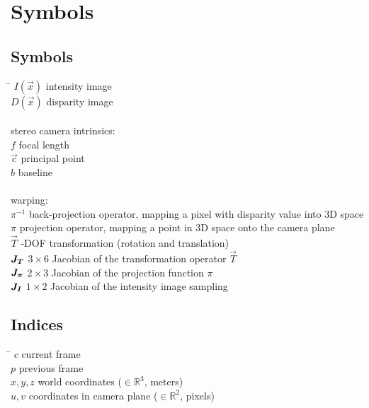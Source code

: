 \chapter*{Symbols}
\label{sec:symbols}

\section*{Symbols}

\begin{tabbing}
 \hspace*{1.6cm} \= \kill
 $I(\vec{x})$          \> intensity image \\[0.5ex]
 $D(\vec{x})$          \> disparity image \\[0.5ex]
 \\
 stereo camera intrinsics: \\
 $f$                            \> focal length \\[0.5ex]
 $\vec{c}$                      \> principal point \\[0.5ex]
 $b$                            \> baseline \\[0.5ex]
 \\
 warping: \\
 $\pi^{-1}$                     \> back-projection operator, mapping a pixel with disparity value into 3D space \\[0.5ex]
 $\pi$                          \> projection operator, mapping a point in 3D space onto the camera plane \\[0.5ex]
 $\vec{T}$                      -DOF transformation (rotation and translation) \\[0.5ex]
 $\mat{J_T}$                    \> $3 \times 6$ Jacobian of the transformation operator $\vec{T}$ \\[0.5ex]
 $\mat{J_{\pi}}$                    \> $2 \times 3$ Jacobian of the projection function $\pi$ \\[0.5ex]
 $\mat{J_I}$                    \> $1 \times 2$ Jacobian of the intensity image sampling \\[0.5ex]
\end{tabbing}

\section*{Indices}
\begin{tabbing}
 \hspace*{1.6cm}  \= \kill
 $c$ \> current frame \\[0.5ex]
 $p$ \> previous frame \\[0.5ex]
 $x, y, z$ \> world coordinates ($\in \mathbb{R}^3$, \unit{meters}) \\[0.5ex]
 $u, v$ \> coordinates in camera plane ($\in \mathbb{R}^2$, \unit{pixels}) \\[0.5ex]

\end{tabbing}

